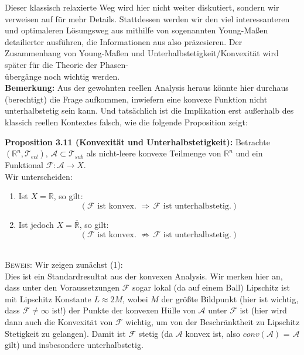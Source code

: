 Dieser klassisch relaxierte Weg wird hier nicht weiter diskutiert, sondern wir verweisen auf \cite{RelaxPaper} für mehr Details. Stattdessen werden wir den viel interessanteren und optimaleren Lösungsweg aus \cite{RelaxPaper} mithilfe von sogenannten Young-Maßen detailierter ausführen, die Informationen aus \cite{RelaxPaper} also präzesieren. Der Zusammenhang von Young-Maßen und Unterhalbstetigkeit/Konvexität wird später für die Theorie der Phasen-\\übergänge noch wichtig werden.\\

\textbf{Bemerkung:} Aus der gewohnten reellen Analysis heraus könnte hier durchaus \\(berechtigt) die Frage aufkommen, inwiefern eine konvexe Funktion nicht unterhalbstetig sein kann. Und tatsächlich ist die Implikation erst außerhalb des klassich reellen Kontextes falsch, wie die folgende Proposition zeigt:\\[0.5cm]
\colorbox{generalYellow}{\begin{minipage}{16cm}{\textcolor{black}{}{\label{prop3.11}}}
\textbf{Proposition 3.11 (Konvexität und Unterhalbstetigkeit):} Betrachte \((\mathbb{R}^n,\mathcal{T}_{ecl}), \, \mathcal{A} \subset \mathcal{T}_{sub}\) als nicht-leere konvexe Teilmenge von \(\mathbb{R}^n\) und ein Funktional \(\mathcal{F}:\mathcal{A} \to X\).\\
Wir unterscheiden:
\begin{enumerate}
    \item Ist \(X=\mathbb{R}\), so gilt: 
        \begin{equation}(\mathcal{F} \text{ ist konvex. } \Rightarrow \,\mathcal{F}\text{ ist unterhalbstetig.})\end{equation}
    \item Ist jedoch \(X=\overline{\mathbb{R}}\), so gilt: 
        \begin{equation}(\mathcal{F} \text{ ist konvex. } \nRightarrow \,\mathcal{F}\text{ ist unterhalbstetig.})\end{equation}
\end{enumerate}
\end{minipage}}\\

\textsc{Beweis:} Wir zeigen zunächst (1): \\
Dies ist ein Standardresultat aus der konvexen Analysis. Wir merken hier an, dass unter den Voraussetzungen \(\mathcal{F}\) sogar lokal (da auf einem Ball) Lipschitz ist mit Lipschitz Konstante \(L \approx 2M\), wobei \(M\) der größte Bildpunkt (hier ist wichtig, dass \(\mathcal{F} \neq \infty\) ist!) der Punkte der konvexen Hülle von \(\mathcal{A}\) unter \(\mathcal{F}\) ist (hier wird dann auch die Konvexität von \(\mathcal{F}\) wichtig, um von der Beschränktheit zu Lipschitz Stetigkeit zu gelangen). Damit ist \(\mathcal{F}\) stetig (da \(\mathcal{A}\) konvex ist, also \(conv(\mathcal{A})\) = \(\mathcal{A}\) gilt) und insbesondere unterhalbstetig.

